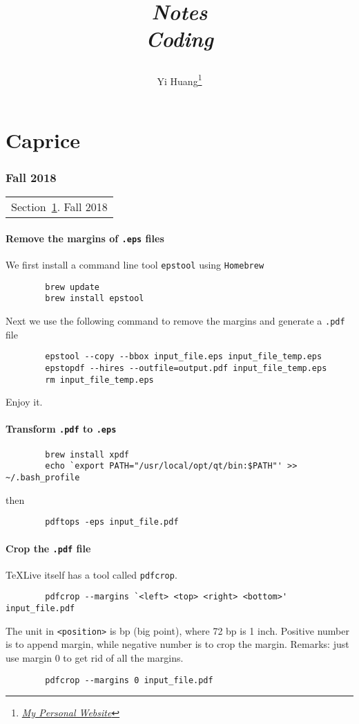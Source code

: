 \documentclass[10pt]{article}
\title{\begin{center}{\Huge \textit{Notes}}\\{{\itshape Coding}}\end{center}}
\author{Yi Huang\footnote{\href{https://yiihuang.com/}{\textit{My Personal Website}}}}
\affiliation{
University of Minnesota
}
\begin{document}
	\maketitle
	\flushbottom
	\newpage
	\pagestyle{fancynotes}
	\part{Caprice}
	\section{Fall 2018}\label{sec:fall2018}
	\begin{margintable}\vspace{.8in}\footnotesize
		\begin{tabularx}{\marginparwidth}{|X}
		Section~\ref{sec:fall2018}. Fall 2018\\
		\end{tabularx}
	\end{margintable}

	\subsection{Remove the margins of \texttt{.eps} files}

	We first install a command line tool \texttt{epstool} using \texttt{Homebrew}
	\begin{verbatim}
		brew update
		brew install epstool
	\end{verbatim}
	Next we use the following command to remove the margins and generate a \texttt{.pdf} file
	\begin{verbatim}
		epstool --copy --bbox input_file.eps input_file_temp.eps
		epstopdf --hires --outfile=output.pdf input_file_temp.eps
		rm input_file_temp.eps
	\end{verbatim}
	Enjoy it.

	\subsection{Transform \texttt{.pdf} to \texttt{.eps}}
	\begin{verbatim}
		brew install xpdf
		echo `export PATH="/usr/local/opt/qt/bin:$PATH"' >> ~/.bash_profile
	\end{verbatim}
	then 
	\begin{verbatim}
		pdftops -eps input_file.pdf
	\end{verbatim}

	\subsection{Crop the \texttt{.pdf} file}
	TeXLive itself has a tool called \texttt{pdfcrop}.
	\begin{verbatim}
		pdfcrop --margins `<left> <top> <right> <bottom>' input_file.pdf
	\end{verbatim}
	The unit in \texttt{<position>} is bp (big point), where 72 bp is 1 inch. Positive number is to append margin, while negative number is to crop the margin.
	Remarks: just use margin 0 to get rid of all the margins.
	\begin{verbatim}
		pdfcrop --margins 0 input_file.pdf
	\end{verbatim}
\end{document}
